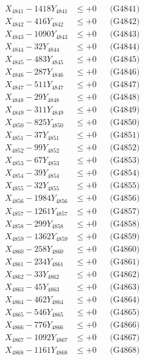 \documentclass[a4paper,10pt]{article}
\begin{document}
{\begin{align}
\allowbreak
X_{4841} - 1418Y_{4841} &\leq +0 && \text{(G4841)} \\
X_{4842} - 416Y_{4842} &\leq +0 && \text{(G4842)} \\
X_{4843} - 1090Y_{4843} &\leq +0 && \text{(G4843)} \\
X_{4844} - 32Y_{4844} &\leq +0 && \text{(G4844)} \\
X_{4845} - 483Y_{4845} &\leq +0 && \text{(G4845)} \\
X_{4846} - 287Y_{4846} &\leq +0 && \text{(G4846)} \\
X_{4847} - 511Y_{4847} &\leq +0 && \text{(G4847)} \\
X_{4848} - 29Y_{4848} &\leq +0 && \text{(G4848)} \\
X_{4849} - 311Y_{4849} &\leq +0 && \text{(G4849)} \\
X_{4850} - 825Y_{4850} &\leq +0 && \text{(G4850)} \\
\allowbreak
X_{4851} - 37Y_{4851} &\leq +0 && \text{(G4851)} \\
X_{4852} - 99Y_{4852} &\leq +0 && \text{(G4852)} \\
X_{4853} - 67Y_{4853} &\leq +0 && \text{(G4853)} \\
X_{4854} - 39Y_{4854} &\leq +0 && \text{(G4854)} \\
X_{4855} - 32Y_{4855} &\leq +0 && \text{(G4855)} \\
X_{4856} - 1984Y_{4856} &\leq +0 && \text{(G4856)} \\
X_{4857} - 1261Y_{4857} &\leq +0 && \text{(G4857)} \\
X_{4858} - 299Y_{4858} &\leq +0 && \text{(G4858)} \\
X_{4859} - 1362Y_{4859} &\leq +0 && \text{(G4859)} \\
X_{4860} - 258Y_{4860} &\leq +0 && \text{(G4860)} \\
\allowbreak
X_{4861} - 234Y_{4861} &\leq +0 && \text{(G4861)} \\
X_{4862} - 33Y_{4862} &\leq +0 && \text{(G4862)} \\
X_{4863} - 45Y_{4863} &\leq +0 && \text{(G4863)} \\
X_{4864} - 462Y_{4864} &\leq +0 && \text{(G4864)} \\
X_{4865} - 546Y_{4865} &\leq +0 && \text{(G4865)} \\
X_{4866} - 776Y_{4866} &\leq +0 && \text{(G4866)} \\
X_{4867} - 1092Y_{4867} &\leq +0 && \text{(G4867)} \\
X_{4868} - 1161Y_{4868} &\leq +0 && \text{(G4868)} \\

\end{align}}
\end{document}
